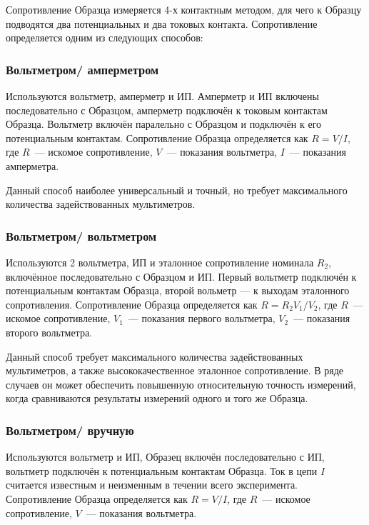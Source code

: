 \label{sec_r_measures}

Сопротивление Образца измеряется 4-х контактным методом, для чего к Образцу подводятся два потенциальных и два токовых контакта. Сопротивление определяется одним из следующих способов:

\subsubsection{Вольтметром/ амперметром}

Используются вольтметр, амперметр и ИП. Амперметр и ИП включены последовательно с Образцом, амперметр подключён к токовым контактам Образца. Вольтметр включён паралельно с Образцом и подключён к его потенциальным контактам. Сопротивление Образца определяется как $R = V/I$, где $R$~--- искомое сопротивление, $V$~--- показания вольтметра, $I$~--- показания амперметра.

Данный способ наиболее универсальный и точный, но требует максимального количества задействованных мультиметров.

\subsubsection{Вольтметром/ вольтметром}

Используются 2 вольтметра, ИП и эталонное сопротивление номинала $R_2$, включённое последовательно с Образцом и ИП. Первый вольтметр подключён  к потенциальным контактам Образца, второй вольметр --- к выходам эталонного сопротивления. Сопротивление Образца определяется как $R = R_2 V_1/V_2$, где $R$~--- искомое сопротивление, $V_1$~--- показания первого вольтметра, $V_2$~--- показания второго вольтметра.

Данный способ требует максимального количества задействованных мультиметров, а также высококачественное эталонное сопротивление. В ряде случаев он может обеспечить повышенную относительную точность измерений, когда сравниваются результаты измерений одного и того же Образца.

\subsubsection{Вольтметром/ вручную}
\label{sec_voltmeter_manually}

Используются вольтметр и ИП, Образец включён последовательно с ИП, вольтметр подключён к потенциальным контактам Образца. Ток в цепи $I$ считается известным  и неизменным в течении всего эксперимента. Сопротивление Образца определяется как $R = V/I$, где $R$~--- искомое сопротивление, $V$~--- показания вольтметра.

